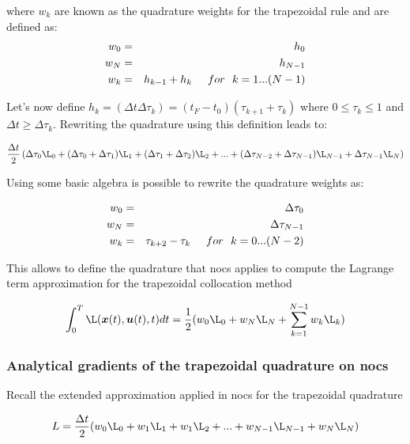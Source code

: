 \documentclass[12pt]{article}
\begin{document}
\noindent where $w_k$ are known as the quadrature weights for the trapezoidal rule and are defined as:
\begin{eqnarray*}
   w_0&=&h_0\\
   w_N&=&h_{N-1}\\
   w_k&=&h_{k-1}+h_k \hspace{0.5cm} for \ \ k=1...(N-1)
\end{eqnarray*}

\noindent Let's now define $h_k=(\Delta t \Delta \tau_k)=(t_F-t_0)(\tau_{k+1}+\tau_{k})$ where $0\leq \tau_k\leq 1$ and $\Delta t \geq \Delta \tau_k $. Rewriting the quadrature using this definition leads to:

\begin{equation}\nonumber
    \frac{\Delta t}{2}\left(\Delta\tau_0\L_0+(\Delta\tau_0+\Delta \tau_1)\L_1+(\Delta\tau_1+\Delta\tau_2)\L_2+...+(\Delta\tau_{N-2}+\Delta\tau_{N-1})\L_{N-1}+\Delta\tau_{N-1}\L_{N}\right)
\end{equation}

\noindent Using some basic algebra is possible to rewrite the quadrature weights as:

\begin{eqnarray*}
   w_0&=&\Delta\tau_0\\
   w_N&=&\Delta\tau_{N-1}\\
   w_k&=&\tau_{k+2}-\tau_k \hspace{0.5cm} for \ \ k=0...(N-2)
\end{eqnarray*}

This allows to define the quadrature that nocs applies to compute the Lagrange term approximation for the trapezoidal collocation method

\begin{equation}
   \int_{0}^{T} \L(\bm{x}(t),\bm{u}(t),t) dt= \frac{1}{2}(w_0\L_0+w_{N}\L_{N}+\sum_{k=1}^{N-1} w_k\L_k)
\end{equation}

\subsubsection{Analytical gradients of the trapezoidal quadrature on nocs}

Recall the extended approximation applied in nocs for the trapezoidal quadrature

\begin{equation}
    L=\frac{\Delta t}{2}(w_0\L_0+w_1\L_1+w_1\L_2+...+w_{N-1}\L_{N-1}+w_{N}\L_{N})
\end{equation}
\end{document}
